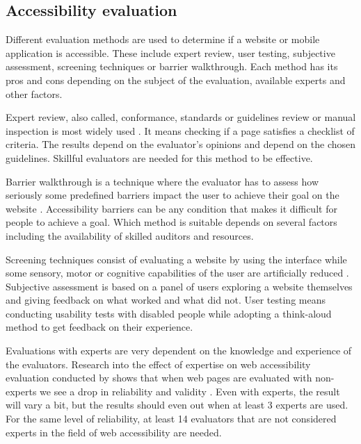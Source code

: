 \documentclass{master_thesis}
\begin{document}
\subsection{Accessibility evaluation}


Different evaluation methods are used to determine if a website or mobile application is accessible. These include expert review, user testing, subjective assessment, screening techniques or barrier walkthrough. Each method has its pros and cons depending on the subject of the evaluation, available experts and other factors.

Expert review, also called, conformance, standards or guidelines review or manual inspection is most widely used \citep{Brajnik2008}. It means checking if a page satisfies a checklist of criteria. The results depend on the evaluator's opinions and depend on the chosen guidelines. Skillful evaluators are needed for this method to be effective.

Barrier walkthrough is a technique where the evaluator has to assess how seriously some predefined barriers impact the user to achieve their goal on the website \citep{Brajnik2008}. Accessibility barriers can be any condition that makes it difficult for people to achieve a goal. Which method is suitable depends on several factors including the availability of skilled auditors and resources.

Screening techniques consist of evaluating a website by using the interface while some sensory, motor or cognitive capabilities of the user are artificially reduced \citep{Brajnik2008}. Subjective assessment is based on a panel of users exploring a website themselves and giving feedback on what worked and what did not. User testing means conducting usability tests with disabled people while adopting a think-aloud method to get feedback on their experience.

Evaluations with experts are very dependent on the knowledge and experience of the evaluators. Research into the effect of expertise on web accessibility evaluation conducted by \citeauthor{Brajnik2011} shows that when web pages are evaluated with non-experts we see a drop in reliability and validity \citep{Brajnik2011}. Even with experts, the result will vary a bit, but the results should even out when at least 3 experts are used. For the same level of reliability, at least 14 evaluators that are not considered experts in the field of web accessibility are needed.
\end{document}

